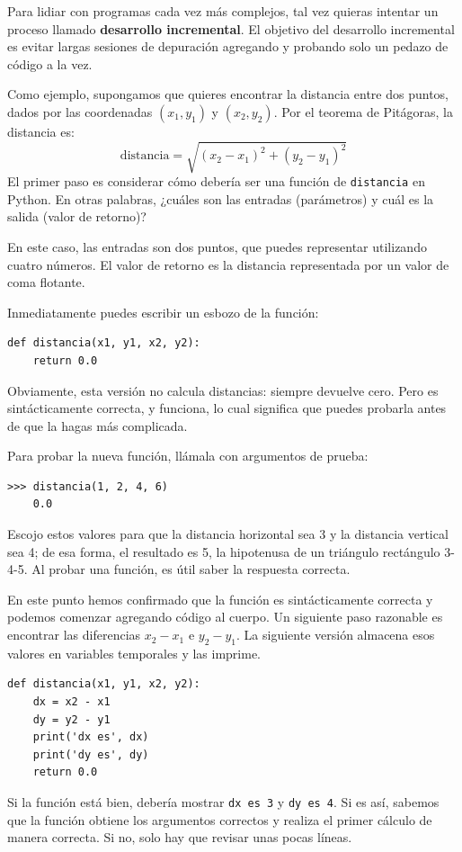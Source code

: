 \documentclass[10pt]{book}
\begin{document}
Para lidiar con programas cada vez más complejos,
tal vez quieras intentar un proceso llamado
{\bf desarrollo incremental}.  El objetivo del desarrollo incremental
es evitar largas sesiones de depuración agregando y probando solo
un pedazo de código a la vez.

Como ejemplo, supongamos que quieres encontrar la distancia entre dos
puntos, dados por las coordenadas $(x_1, y_1)$ y $(x_2, y_2)$.
Por el teorema de Pitágoras, la distancia es:
\begin{displaymath}
\mathrm{distancia} = \sqrt{(x_2 - x_1)^2 + (y_2 - y_1)^2}
\end{displaymath}
%
El primer paso es considerar cómo debería ser una función de {\tt distancia}
en Python.  En otras palabras, ¿cuáles son las entradas (parámetros)
y cuál es la salida (valor de retorno)?

En este caso, las entradas son dos puntos, que puedes representar
utilizando cuatro números.  El valor de retorno es la distancia representada por
un valor de coma flotante.

Inmediatamente puedes escribir un esbozo de la función:

\begin{verbatim}
def distancia(x1, y1, x2, y2):
    return 0.0
\end{verbatim}
%
Obviamente, esta versión no calcula distancias: siempre devuelve
cero.  Pero es sintácticamente correcta, y funciona, lo cual significa que
puedes probarla antes de que la hagas más complicada.

Para probar la nueva función, llámala con argumentos de prueba:

\begin{verbatim}
>>> distancia(1, 2, 4, 6)
    0.0
\end{verbatim}
%
Escojo estos valores para que la distancia horizontal sea 3 y la
distancia vertical sea 4; de esa forma, el resultado es 5, la hipotenusa
de un triángulo rectángulo 3-4-5. Al probar una función, es
útil saber la respuesta correcta.

En este punto hemos confirmado que la función es sintácticamente
correcta y podemos comenzar agregando código al cuerpo.
Un siguiente paso razonable es encontrar las diferencias
$x_2 - x_1$ e $y_2 - y_1$.  La siguiente versión almacena esos valores en
variables temporales y las imprime.

\begin{verbatim}
def distancia(x1, y1, x2, y2):
    dx = x2 - x1
    dy = y2 - y1
    print('dx es', dx)
    print('dy es', dy)
    return 0.0
\end{verbatim}
%
Si la función está bien, debería mostrar \verb"dx es 3" y
\verb"dy es 4".  Si es así, sabemos que la función obtiene los argumentos
correctos y realiza el primer cálculo de manera correcta.  Si no,
solo hay que revisar unas pocas líneas.
\end{document}
